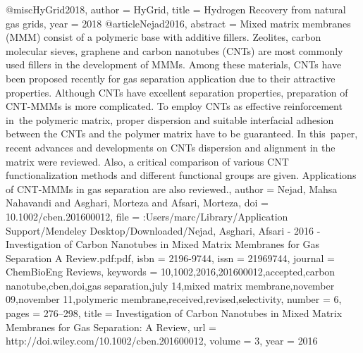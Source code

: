 @misc{HyGrid2018,
author = {HyGrid},
title = {{Hydrogen Recovery from natural gas grids}},
year = {2018}
}
@article{Nejad2016,
abstract = {Mixed matrix membranes (MMM) consist of a polymeric base with additive fillers. Zeolites, carbon molecular sieves, graphene and carbon nanotubes (CNTs) are most commonly used fillers in the development of MMMs. Among these materials, CNTs have been proposed recently for gas separation application due to their attractive properties. Although CNTs have excellent separation properties, preparation of CNT-MMMs is more complicated. To employ CNTs as effective reinforcement in the polymeric matrix, proper dispersion and suitable interfacial adhesion between the CNTs and the polymer matrix have to be guaranteed. In this paper, recent advances and developments on CNTs dispersion and alignment in the matrix were reviewed. Also, a critical comparison of various CNT functionalization methods and different functional groups are given. Applications of CNT-MMMs in gas separation are also reviewed.},
author = {Nejad, Mahsa Nahavandi and Asghari, Morteza and Afsari, Morteza},
doi = {10.1002/cben.201600012},
file = {:Users/marc/Library/Application Support/Mendeley Desktop/Downloaded/Nejad, Asghari, Afsari - 2016 - Investigation of Carbon Nanotubes in Mixed Matrix Membranes for Gas Separation A Review.pdf:pdf},
isbn = {2196-9744},
issn = {21969744},
journal = {ChemBioEng Reviews},
keywords = {10,1002,2016,201600012,accepted,carbon nanotube,cben,doi,gas separation,july 14,mixed matrix membrane,november 09,november 11,polymeric membrane,received,revised,selectivity},
number = {6},
pages = {276--298},
title = {{Investigation of Carbon Nanotubes in Mixed Matrix Membranes for Gas Separation: A Review}},
url = {http://doi.wiley.com/10.1002/cben.201600012},
volume = {3},
year = {2016}
}
